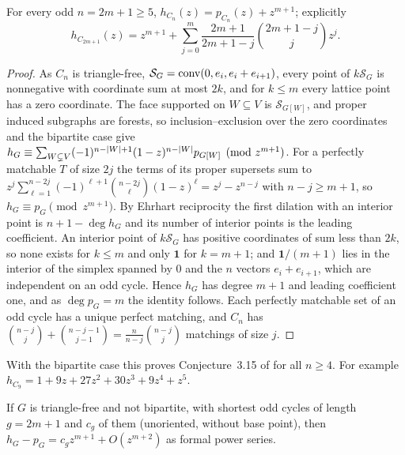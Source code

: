 \begin{theorem}\label{grw:thm:cycle}
For every odd $n=2m+1\ge5$, $h_{C_n}(z)=p_{C_n}(z)+z^{m+1}$; explicitly
\[
 h_{C_{2m+1}}(z)=z^{m+1}+\sum_{j=0}^m\frac{2m+1}{2m+1-j}\binom{2m+1-j}jz^j .
\]
\end{theorem}

\begin{proof}
As $C_n$ is triangle-free, $\mathcal S_G=\operatorname{conv}(0,e_i,e_i+e_{i+1})$, every
point of $k\mathcal S_G$ is nonnegative with coordinate sum at most $2k$, and
for $k\le m$ every lattice point has a zero coordinate. The face supported on
$W\subseteq V$ is $\mathcal S_{G[W]}$, and proper induced subgraphs are
forests, so inclusion--exclusion over the zero coordinates and the bipartite
case give
$h_G\equiv\sum_{W\subsetneq V}(-1)^{n-\lvert W\rvert+1}(1-z)^{n-\lvert W\rvert}p_{G[W]}
\pmod{z^{m+1}}$. For a perfectly matchable $T$ of size $2j$ the terms of its
proper supersets sum to
$z^j\sum_{\ell=1}^{n-2j}(-1)^{\ell+1}\binom{n-2j}\ell(1-z)^\ell=z^j-z^{n-j}$
with $n-j\ge m+1$, so $h_G\equiv p_G\pmod{z^{m+1}}$. By Ehrhart reciprocity
\cite[Chapter~4]{BeckRobins2015Computing} the first dilation with an interior
point is $n+1-\deg h_G$ and its number of interior points is the leading
coefficient. An interior point of $k\mathcal S_G$ has positive coordinates of
sum less than $2k$, so none exists for $k\le m$ and only $\mathbf 1$ for
$k=m+1$; and $\mathbf 1/(m+1)$ lies in the interior of the simplex spanned by
$0$ and the $n$ vectors $e_i+e_{i+1}$, which are independent on an odd cycle.
Hence $h_G$ has degree $m+1$ and leading coefficient one, and as
$\deg p_G=m$ the identity follows. Each perfectly matchable set of an odd
cycle has a unique perfect matching, and $C_n$ has
$\binom{n-j}j+\binom{n-j-1}{j-1}=\frac n{n-j}\binom{n-j}j$ matchings of size $j$.
\end{proof}

With the bipartite case this proves Conjecture~3.15 of
\cite{DavisKohl2024Perfectly} for all $n\ge4$. For example
$h_{C_9}=1+9z+27z^2+30z^3+9z^4+z^5$.

\begin{theorem}\label{grw:thm:oddgirth}
If $G$ is triangle-free and not bipartite, with shortest odd cycles of length
$g=2m+1$ and $c_g$ of them (unoriented, without base point), then
$h_G-p_G=c_gz^{m+1}+O(z^{m+2})$ as formal power series.
\end{theorem}

